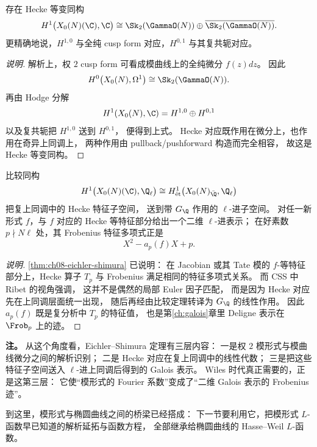 \begin{theorem}
\label{thm:ch08-eichler-shimura-cohomology}
存在 Hecke 等变同构
\[
  H^1\bigl(X_0(N)(\C),\C\bigr)
  \cong 
  \Sk_2(\GammaO(N))\oplus \overline{\Sk_2(\GammaO(N))}.
\]
更精确地说，$H^{1,0}$ 与全纯 cusp form 对应，$H^{0,1}$ 与其复共轭对应。
\end{theorem}

\begin{proof}[说明]
解析上，权 $2$ cusp form 可看成模曲线上的全纯微分 $f(z)dz$。
因此
\[
  H^0\bigl(X_0(N),\Omega^1\bigr)\cong \Sk_2(\GammaO(N)).
\]
再由 Hodge 分解
\[
  H^1(X_0(N),\C)=H^{1,0}\oplus H^{0,1}
\]
以及复共轭把 $H^{1,0}$ 送到 $H^{0,1}$，
便得到上式。
Hecke 对应既作用在微分上，也作用在奇异上同调上，
两种作用由 pullback/pushforward 构造而完全相容，
故这是 Hecke 等变同构。
\end{proof}

\begin{proposition}
\label{prop:ch08-hecke-galois-bridge}
比较同构
\[
  H^1\bigl(X_0(N)(\C),\Q_\ell\bigr)
  \cong
  H^1_{\text{\'{e}t}}\bigl(X_0(N)_{\bar\Q},\Q_\ell\bigr)
\]
把复上同调中的 Hecke 特征子空间，
送到带 $G_\Q$ 作用的 $\ell$-进子空间。
对任一新形式 $f$，与 $f$ 对应的 Hecke 等特征部分给出一个二维 $\ell$-进表示；
在好素数 $p\nmid N\ell$ 处，其 Frobenius 特征多项式正是
\[
  X^2-a_p(f)X+p.
\]
\end{proposition}

\begin{proof}[说明]
\cref{thm:ch08-eichler-shimura} 已说明：
在 Jacobian 或其 Tate 模的 $f$-等特征部分上，Hecke 算子 $T_p$ 与 Frobenius 满足相同的特征多项式关系。
而 CSS 中 Ribet 的视角强调，
这并不是偶然的局部 Euler 因子匹配，
而是因为 Hecke 对应先在上同调层面统一出现，
随后再经由比较定理转译为 $G_\Q$ 的线性作用。
因此 $a_p(f)$ 既是复分析中 $T_p$ 的特征值，
也是第\ref{ch:galois}章里 Deligne 表示在 $\Frob_p$ 上的迹。
\end{proof}

\textbf{注。}
从这个角度看，Eichler--Shimura 定理有三层内容：
一是权 $2$ 模形式与模曲线微分之间的解析识别；
二是 Hecke 对应在复上同调中的线性代数；
三是把这些特征子空间送入 $\ell$-进上同调后得到的 Galois 表示。
Wiles 时代真正需要的，正是这第三层：
它使“模形式的 Fourier 系数”变成了“二维 Galois 表示的 Frobenius 迹”。

到这里，模形式与椭圆曲线之间的桥梁已经搭成：
下一节要利用它，把模形式 $L$-函数早已知道的解析延拓与函数方程，
全部继承给椭圆曲线的 Hasse--Weil $L$-函数。

